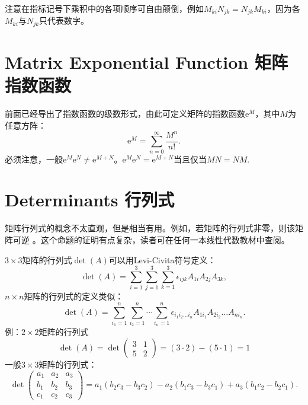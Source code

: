 注意在指标记号下乘积中的各项顺序可自由颠倒，例如$M_{ki} N_{jk} = N_{jk} M_{ki}$，因为各$M_{ki}$与$N_{jk}$只代表数字。


\section[矩阵指数函数]{Matrix Exponential Function 矩阵指数函数}
\label{appendix.C.2}
前面已经导出了指数函数的级数形式，由此可定义矩阵的指数函数$\mathrm{e}^M$，其中$M$为任意方阵：
\begin{equation}
\label{equC.4}
	\mathrm{e}^M = \sum_{n = 0}^\infty \frac{M^n}{n!}.
\end{equation}
必须注意，一般$\mathrm{e}^M \mathrm{e}^N \neq \mathrm{e}^{M + N}$。$\mathrm{e}^M \mathrm{e}^N = \mathrm{e}^{M + N}$当且仅当$MN = NM$.

\section[行列式]{Determinants 行列式}
\label{appendix.C.3}
矩阵行列式的概念不太直观，但是相当有用。例如，若矩阵的行列式非零，则该矩阵可逆%
%
。这个命题的证明有点复杂，读者可在任何一本线性代数教材中查阅。

$3 \times 3$矩阵的行列式$\det (A)$可以用Levi-Civita符号定义：
\begin{equation}
\label{equC.5}
	\det (A) = \sum_{i = 1}^3 \sum_{j = 1}^3 \sum_{k = 1}^3 \epsilon_{ijk} A_{1i} A_{2j} A_{3k},
\end{equation}
$n \times n$矩阵的行列式的定义类似：
\begin{equation}
\label{equC.6}
	\det (A) = \sum_{i_1 = 1}^n \sum_{i_2 = 1}^n \cdots \sum_{i_n = 1}^n \epsilon_{i_1 i_2 \dots i_n} A_{1 i_1} A_{2 i_2} \dots A_{n i_n}.
\end{equation}
例：$2 \times 2$矩阵的行列式
\[
	\det (A) = \det
		\begin{pmatrix}
			3 & 1 \\
			5 & 2
		\end{pmatrix}
	= (3 \cdot 2) - (5 \cdot 1) = 1
\]
一般$3 \times 3$矩阵的行列式：
\begin{equation}
\label{equC.7}
	\det
		\begin{pmatrix}
			a_1 & a_2 & a_3 \\
			b_1 & b_2 & b_3 \\
			c_1 & c_2 & c_3
		\end{pmatrix}
	= a_1 (b_2 c_3 - b_3 c_2) - a_2 (b_1 c_3 - b_3 c_1) + a_3 (b_1 c_2 - b_2 c_1).
\end{equation}


